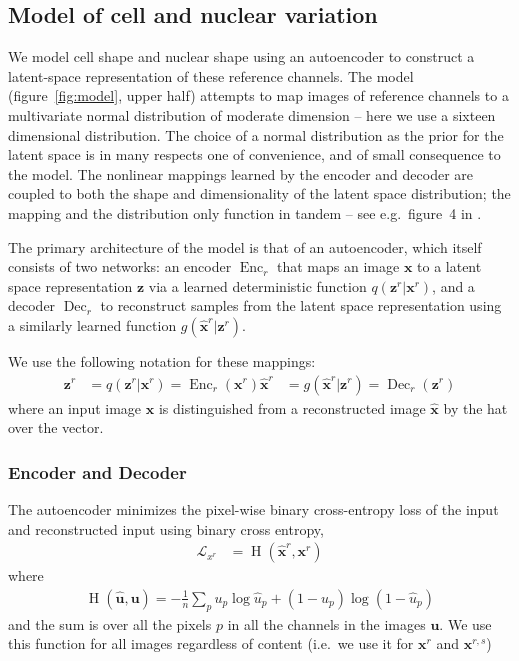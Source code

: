\documentclass[accepted]{article}
\def\\{}%
\DeclareMathOperator{\Enc}{Enc}
\DeclareMathOperator{\Dec}{Dec}
\DeclareMathOperator{\bce}{H}
\begin{document}
\subsection{Model of cell and nuclear variation} \label{subsub:model_cellnuc}

We model cell shape and nuclear shape using an autoencoder to construct a latent-space representation of these reference channels.
The model (figure~\ref{fig:model}, upper half) attempts to map images of reference channels to a multivariate normal distribution of moderate dimension -- here we use a sixteen dimensional distribution.
The choice of a normal distribution as the prior for the latent space is in many respects one of convenience, and of small consequence to the model.
The nonlinear mappings learned by the encoder and decoder are coupled to both the shape and dimensionality of the latent space distribution; the mapping and the distribution only function in tandem -- see e.g.\ figure~4 in \cite{Makhzani:2015tm}.

The primary architecture of the model is that of an autoencoder, which itself consists of two networks: an encoder $\Enc_r$ that maps an image $\bm{x}$ to a latent space representation $\bm{z}$ via a learned deterministic function $q(\bm{z}^r|\bm{x}^r)$, and a decoder $\Dec_r$ to reconstruct samples from the latent space representation using a similarly learned function $g(\hat{\bm{x}}^r|\bm{z}^r)$.

We use the following notation for these mappings:
%
\begin{align}
    \bm{z}^r &= q(\bm{z}^r|\bm{x}^r) = \Enc_r(\bm{x}^r) \\
    \hat{\bm{x}}^r &= g(\hat{\bm{x}}^r|\bm{z}^r) = \Dec_r(\bm{z}^r)
\end{align}
%
where an input image $\bm{x}$ is distinguished from a reconstructed image $\hat{\bm{x}}$ by the hat over the vector.


\subsubsection{Encoder and Decoder}

The autoencoder minimizes the pixel-wise binary cross-entropy loss of the input and reconstructed input using binary cross entropy,
%
\begin{align} \label{eqn:loss_xr}
    \mathcal{L}_{x^r} &= \bce( \hat{\bm{x}}^r, \bm{x}^r)
\end{align}
%
where
%
\begin{align}
    \bce(\bm{\hat{u}}, \bm{u}) =
        -\tfrac{1}{n} \sum_{p}
            u_p \log{\hat{u}_p} +
            (1 - u_p) \log{(1-\hat{u}_p)}
\end{align}
%
and the sum is over all the pixels $p$ in all the channels in the images $\bm{u}$.
We use this function for all images regardless of content (i.e.\ we use it for $\bm{x}^r$ and $\bm{x}^{r,s}$)
\end{document}
